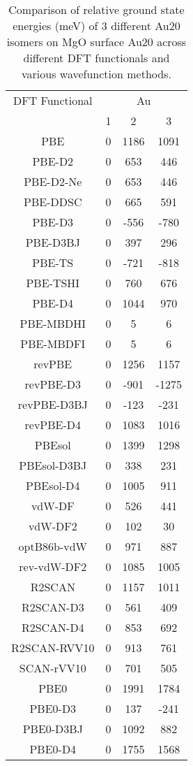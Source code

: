 \begin{table}[ht]
\centering
\caption{Comparison of relative ground state energies (meV) of 3 different Au20 isomers on MgO surface Au20 across different DFT functionals and various wavefunction methods.}
\begin{tabular}{cccc}
\hline\hline
DFT Functional & \multicolumn{3}{c}{Au} \\ 
\cline{2-4}
 & 1 & 2 & 3 \\ \hline
PBE & 0 & 1186 & 1091 \\ 
PBE-D2 & 0 & 653 & 446 \\ 
PBE-D2-Ne & 0 & 653 & 446 \\ 
PBE-DDSC & 0 & 665 & 591 \\ 
PBE-D3 & 0 & -556 & -780 \\ 
PBE-D3BJ & 0 & 397 & 296 \\ 
PBE-TS & 0 & -721 & -818 \\ 
PBE-TSHI & 0 & 760 & 676 \\ 
PBE-D4 & 0 & 1044 & 970 \\ 
PBE-MBDHI & 0 & 5 & 6 \\ 
PBE-MBDFI & 0 & 5 & 6 \\ 
revPBE & 0 & 1256 & 1157 \\ 
revPBE-D3 & 0 & -901 & -1275 \\ 
revPBE-D3BJ & 0 & -123 & -231 \\ 
revPBE-D4 & 0 & 1083 & 1016 \\ 
PBEsol & 0 & 1399 & 1298 \\ 
PBEsol-D3BJ & 0 & 338 & 231 \\ 
PBEsol-D4 & 0 & 1005 & 911 \\ 
vdW-DF & 0 & 526 & 441 \\ 
vdW-DF2 & 0 & 102 & 30 \\ 
optB86b-vdW & 0 & 971 & 887 \\ 
rev-vdW-DF2 & 0 & 1085 & 1005 \\ 
R2SCAN & 0 & 1157 & 1011 \\ 
R2SCAN-D3 & 0 & 561 & 409 \\ 
R2SCAN-D4 & 0 & 853 & 692 \\ 
R2SCAN-RVV10 & 0 & 913 & 761 \\ 
SCAN-rVV10 & 0 & 701 & 505 \\ 
PBE0 & 0 & 1991 & 1784 \\ 
PBE0-D3 & 0 & 137 & -241 \\ 
PBE0-D3BJ & 0 & 1092 & 882 \\ 
PBE0-D4 & 0 & 1755 & 1568 \\ 

\end{tabular}
\end{table}
